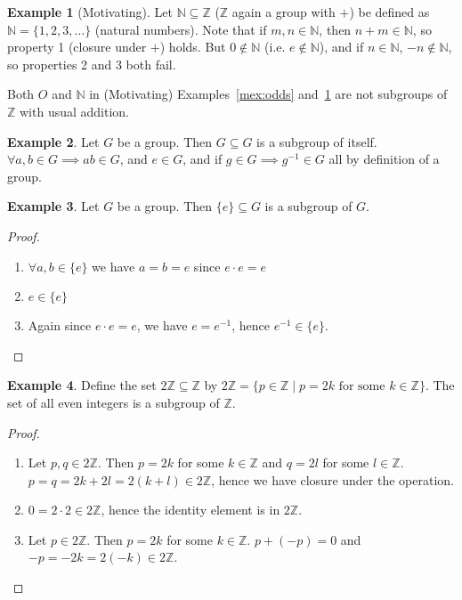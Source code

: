 \documentclass[12pt,letterpaper,DIV=11,final]{scrartcl}
\theoremstyle{plain}
\theoremstyle{definition}
\newtheorem{example}{Example}[section]
\theoremstyle{remark}
\begin{document}
\begin{example}[Motivating]\label{mex:nats}
  Let $\mathbb{N} \subseteq \mathbb{Z}$ ($\mathbb{Z}$ again a group with $+$) be defined as $\mathbb{N} = \{ 1, 2, 3, \dots \}$ (natural numbers).
  Note that if $m, n \in \mathbb{N}$, then $n + m \in \mathbb{N}$, so property 1 (closure under $+$) holds.
  But $0 \notin \mathbb{N}$ (i.e. $e \notin \mathbb{N}$), and if $n \in \mathbb{N}$, $-n \notin \mathbb{N}$, so properties 2 and 3 both fail.
\end{example}

Both $O$ and $\mathbb{N}$ in (Motivating) Examples~\ref{mex:odds} and~\ref{mex:nats} are not subgroups of $\mathbb{Z}$ with usual addition.

\begin{example}
  Let $G$ be a group.
  Then $G \subseteq G$ is a subgroup of itself. $\forall a, b \in G \implies ab \in G$, and $e \in G$, and if $g \in G \implies g^{-1} \in G$ all by definition of a group.
\end{example}

\begin{example}
  Let $G$ be a group.
  Then $\{ e \} \subseteq G$ is a subgroup of $G$.

  \begin{proof}\leavevmode
    \begin{enumerate}
      \item $\forall a, b \in \{ e \}$ we have $a = b = e$ since $e \cdot e = e$
      \item $e \in \{ e \}$
      \item Again since $e \cdot e = e$, we have $e = e^{-1}$, hence $e^{-1} \in \{ e \}$.
        \qedhere
    \end{enumerate}
  \end{proof}
\end{example}

\begin{example}\label{ex:2z}
  Define the set $2 \mathbb{Z} \subseteq \mathbb{Z}$ by $2 \mathbb{Z} = \{ p \in \mathbb{Z} \mid p = 2k \text{ for some } k \in \mathbb{Z} \}$.
  The set of all even integers is a subgroup of $\mathbb{Z}$.

  \begin{proof}\leavevmode
    \begin{enumerate}
      \item Let $p, q \in 2 \mathbb{Z}$.
        Then $p = 2k$ for some $k \in \mathbb{Z}$ and $q = 2l$ for some $l \in \mathbb{Z}$.
        $p = q = 2k + 2l = 2 (k + l) \in 2 \mathbb{Z}$, hence we have closure under the operation.

      \item $0 = 2 \cdot 2 \in 2 \mathbb{Z}$, hence the identity element is in $2 \mathbb{Z}$.

      \item Let $p \in 2 \mathbb{Z}$.
        Then $p = 2k$ for some $k \in \mathbb{Z}$.
        $p + (-p) = 0$ and $-p = -2k = 2 (-k) \in 2 \mathbb{Z}$.
        \qedhere
    \end{enumerate}
  \end{proof}
\end{example}
\end{document}
